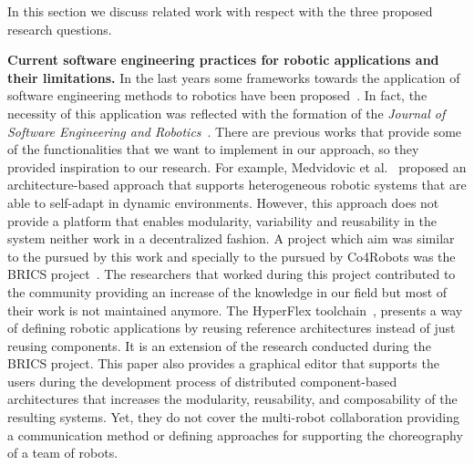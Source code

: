 In this section we discuss related work with respect with the three proposed research questions.

\textbf{Current software engineering practices for robotic applications and their limitations.}
In the last years some frameworks towards the application of software engineering methods to robotics have been proposed~\cite{Ramaswamy2014}.
In fact, the necessity of this application was reflected with the formation of the \emph{Journal of Software Engineering and Robotics}~\cite{Brugali2010_journal}.
There are previous works that provide some of the functionalities that we want to implement in our approach, so they provided inspiration to our research.
For example, Medvidovic et al.~\cite{medvidovic} proposed an architecture-based approach that supports heterogeneous robotic systems that are able to self-adapt in dynamic environments.
However, this approach does not provide a platform that enables modularity, variability and reusability in the system neither work in a decentralized fashion.
A project which aim was similar to the pursued by this work and specially to the pursued by Co4Robots was the BRICS project~\cite{Bischoff2010}. 
The researchers that worked during this project contributed to the community providing an increase of the knowledge in our field but most of their work is not maintained anymore.
The HyperFlex toolchain~\cite{gherardi}, presents a way of defining robotic applications by reusing reference architectures instead of just reusing components.
It is an extension of the research conducted during the BRICS project.
This paper also provides a graphical editor that supports the users during the development process of distributed component-based architectures that increases the modularity, reusability, and composability of the resulting systems.
Yet, they do not cover the multi-robot collaboration providing a communication method or defining approaches for supporting the choreography of a team of robots.

